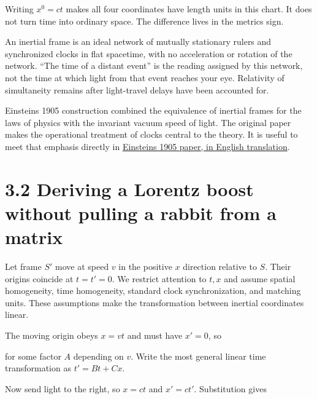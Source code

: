 \documentclass[
  11pt,
  letterpaper,
  oneside,
  openany]{scrbook}
\begin{document}
Writing \(x^0=ct\) makes all four coordinates have length units in this
chart. It does not turn time into ordinary space. The difference lives
in the metric\textquotesingle s sign.

An inertial frame is an ideal network of mutually stationary rulers and
synchronized clocks in flat spacetime, with no acceleration or rotation
of the network. ``The time of a distant event'' is the reading assigned
by this network, not the time at which light from that event reaches
your eye. Relativity of simultaneity remains after light-travel delays
have been accounted for.

Einstein\textquotesingle s 1905 construction combined the equivalence of
inertial frames for the laws of physics with the invariant vacuum speed
of light. The original paper makes the operational treatment of clocks
central to the theory. It is useful to meet that emphasis directly in
\href{https://sites.pitt.edu/~jdnorton/teaching/Einstein_graduate/pdfs/Einstein_STR_1905_English.pdf}{Einstein\textquotesingle s
1905 paper, in English translation}.

\hypertarget{deriving-a-lorentz-boost-without-pulling-a-rabbit-from-a-matrix}{%
\section{3.2 Deriving a Lorentz boost without pulling a rabbit from a
matrix}\label{deriving-a-lorentz-boost-without-pulling-a-rabbit-from-a-matrix}}

Let frame \(S'\) move at speed \(v\) in the positive \(x\) direction
relative to \(S\). Their origins coincide at \(t=t'=0\). We restrict
attention to \(t,x\) and assume spatial homogeneity, time homogeneity,
standard clock synchronization, and matching units. These assumptions
make the transformation between inertial coordinates linear.

The moving origin obeys \(x=vt\) and must have \(x'=0\), so

\begin{center}
\begingroup
{}
\ifdim\wd\grmathbox>\linewidth
\resizebox{\linewidth}{!}{\usebox{\grmathbox}}
\else\usebox{\grmathbox}\fi
\endgroup
\end{center}

for some factor \(A\) depending on \(v\). Write the most general linear
time transformation as \(t'=B t+C x\).

Now send light to the right, so \(x=ct\) and \(x'=ct'\). Substitution
gives
\end{document}
